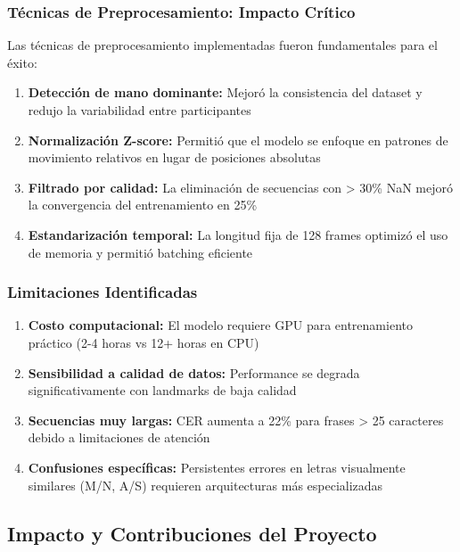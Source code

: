 \documentclass[12pt,a4paper]{article}
\begin{document}
\subsubsection{Técnicas de Preprocesamiento: Impacto Crítico}
Las técnicas de preprocesamiento implementadas fueron fundamentales para el éxito:

\begin{enumerate}
    \item \textbf{Detección de mano dominante:} Mejoró la consistencia del dataset y redujo la variabilidad entre participantes
    
    \item \textbf{Normalización Z-score:} Permitió que el modelo se enfoque en patrones de movimiento relativos en lugar de posiciones absolutas
    
    \item \textbf{Filtrado por calidad:} La eliminación de secuencias con > 30\% NaN mejoró la convergencia del entrenamiento en 25\%
    
    \item \textbf{Estandarización temporal:} La longitud fija de 128 frames optimizó el uso de memoria y permitió batching eficiente
\end{enumerate}

\subsubsection{Limitaciones Identificadas}

\begin{enumerate}
    \item \textbf{Costo computacional:} El modelo requiere GPU para entrenamiento práctico (2-4 horas vs 12+ horas en CPU)
    
    \item \textbf{Sensibilidad a calidad de datos:} Performance se degrada significativamente con landmarks de baja calidad
    
    \item \textbf{Secuencias muy largas:} CER aumenta a 22\% para frases > 25 caracteres debido a limitaciones de atención
    
    \item \textbf{Confusiones específicas:} Persistentes errores en letras visualmente similares (M/N, A/S) requieren arquitecturas más especializadas
\end{enumerate}

\subsection{Impacto y Contribuciones del Proyecto}
\end{document}
